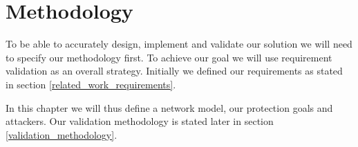 \chapter{Methodology}
\label{methodology}

To be able to accurately design, implement and validate our solution we will need to specify our methodology first. To achieve our goal we will use requirement validation as an overall strategy. Initially we defined our requirements as stated in section \ref{related_work_requirements}.

In this chapter we will thus define a network model, our protection goals and attackers. Our validation methodology is stated later in section \ref{validation_methodology}.

